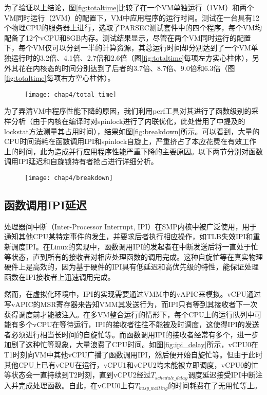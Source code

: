 为了验证以上结论，图\ref{fig:totaltime}比较了在一个VM单独运行（1VM）和两个VM同时运行（2VM）的配置下，VM中应用程序的运行时间。测试在一台具有12个物理CPU的服务器上进行，选取了PARSEC\cite{bienia2008parsec}测试套件中的四个程序，每个VM均配备了12个vCPU和8GB内存。测试结果显示，尽管在两个VM同时运行的配置下，每个VM仅可以分到一半的计算资源，其总运行时间却分别达到了一个VM单独运行时的3.2倍、4.1倍、2.7倍和2.6倍（图\ref{fig:totaltime}每项左方实心柱体），另外其花在内核态的时间分别达到了后者的3.7倍、8.7倍、9.0倍和6.3倍（图\ref{fig:totaltime}每项右方空心柱体）。

\begin{figure}[!htp]
  \centering
  \texttt{[image: chap4/total\_time]}
\end{figure}

为了弄清VM中程序性能下降的原因，我们利用perf\cite{perf}工具对其进行了函数级别的采样分析（由于内核在编译时对spinlock进行了内联优化，此处借用了\cite{lockstat}中提及的lockstat方法测量其占用时间），结果如图\ref{fig:breakdown}所示。可以看到，大量的CPU时间消耗在函数调用IPI和spinlock自旋上，严重挤占了本应花费在有效工作上的时间，此为造成并行应用程序性能严重下降的主要原因。以下两节分别对函数调用IPI延迟和自旋锁持有者抢占进行详细分析。

\begin{figure}[!htp]
  \centering
  \texttt{[image: chap4/breakdown]}
\end{figure}

\subsection{函数调用IPI延迟}

处理器间中断（Inter-Processor Interrupt, IPI）在SMP内核中被广泛使用，用于通知其他CPU某特定事件的发生，并要求后者执行相应操作，如TLB失效IPI和重新调度IPI\cite{hammalund2003inter}。在Linux的实现中，函数调用IPI的发起者在中断发送后将一直处于忙等状态，直到所有的接收者对相应处理函数的调用完成\cite{linux}。这种自旋忙等在真实物理硬件上是高效的，因为基于硬件的IPI具有低延迟和高优先级的特性\cite{liu2014scalable}，能保证处理函数在IPI接收者上迅速调用完成。

然而，在虚拟化环境中，IPI的实现需要通过VMM中的vAPIC来模拟。vCPU通过写vAPIC的MSR寄存器来告知VMM其发送行为，而IPI只有等到其接收者下一次获得调度前才能被注入。在多VM整合运行的情形下，每个CPU上的运行队列中可能有多个vCPU在等待运行，IPI的接收者往往不能被及时调度，这使得IPI的发送者必须进行相当长时间的自旋忙等。而函数调用IPI的接收者经常有多个，进一步加剧了这种忙等现象，大量浪费了CPU时间。如图\ref{fig:ipi_delay}所示，vCPU0在T1时刻向VM中其他vCPU广播了函数调用IPI，然后便开始自旋忙等。但由于此时其他CPU上已有vCPU在运行，vCPU1和vCPU2均未能被立即调度，vCPU0的忙等状态会一直持续到T2时刻，直到vCPU2经过$T_{schedule\_delay}$调度延迟接受IPI中断注入并完成处理函数。自此，在vCPU0上有$T_{busy\_waiting}$的时间耗费在了无用忙等上。

